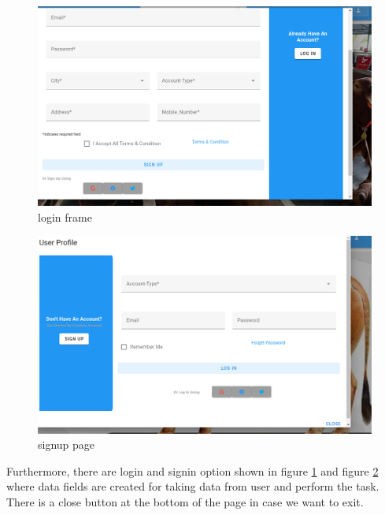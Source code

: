 \documentclass[a4paper,12pt]{report}
\begin{document}
\begin{figure}[]
	\includegraphics[keepaspectratio, width=\linewidth]{signin.png}
	\caption{login frame}
	\label{login}
\end{figure}
\begin{figure}[]
	\includegraphics[keepaspectratio , width=\linewidth]{signup.png}
	\caption{signup page}
	\label{signup}
\end{figure}

Furthermore, there are login and signin option shown in figure \ref{login} and figure \ref{signup} where data fields are created for taking data from user and perform the task. There is a close button at the bottom of the page in case we want to exit.
\end{document}
